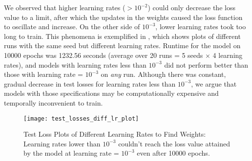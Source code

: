 We observed that higher learning rates ($>10^{-2}$) could only decrease the loss value to a limit, after which the updates in the weights caused the loss function to oscillate and increase. On the other side of $10^{-3}$, lower learning rates took too long to train. This phenomena is exemplified in , which shows plots of different runs with the same seed but different learning rates. Runtime for the model on 10000 epochs was 1232.56 seconds (average over 20 runs = 5 seeds $\times$ 4 learning rates), and models with learning rates less than $10^{-3}$ did not perform better than those with learning rate = $10^{-3}$ on \textit{any} run. Although there was constant, gradual decrease in test losses for learning rates less than $10^{-3}$, we argue that models with those specifications may be computationally expensive and temporally inconvenient to train.
\begin{figure}[!htbp]
    \centering
    \texttt{[image: test\_losses\_diff\_lr\_plot]}
    \caption[Test Loss Plots of Different Learning Rates to Find Weights]{Test Loss Plots of Different Learning Rates to Find Weights: Learning rates lower than $10^{-3}$ couldn't reach the loss value attained by the model at learning rate = $10^{-3}$ even after 10000 epochs.}
    \label{fig:Test Loss Plots of Different Learning Rates to Find Weights}
\end{figure}
